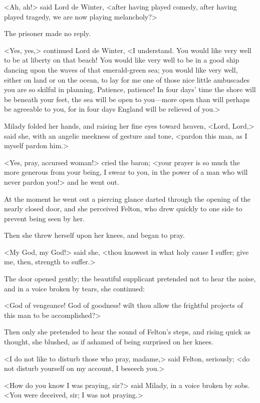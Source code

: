 <Ah, ah!> said Lord de Winter, <after having played comedy, after having played tragedy, we are now playing melancholy?> 

The prisoner made no reply. 

<Yes, yes,> continued Lord de Winter, <I understand. You would like very well to be at liberty on that beach! You would like very well to be in a good ship dancing upon the waves of that emerald-green sea; you would like very well, either on land or on the ocean, to lay for me one of those nice little ambuscades you are so skilful in planning. Patience, patience! In four days' time the shore will be beneath your feet, the sea will be open to you---more open than will perhaps be agreeable to you, for in four days England will be relieved of you.> 

Milady folded her hands, and raising her fine eyes toward heaven, <Lord, Lord,> said she, with an angelic meekness of gesture and tone, <pardon this man, as I myself pardon him.> 

<Yes, pray, accursed woman!> cried the baron; <your prayer is so much the more generous from your being, I swear to you, in the power of a man who will never pardon you!> and he went out. 

At the moment he went out a piercing glance darted through the opening of the nearly closed door, and she perceived Felton, who drew quickly to one side to prevent being seen by her. 

Then she threw herself upon her knees, and began to pray. 

<My God, my God!> said she, <thou knowest in what holy cause I suffer; give me, then, strength to suffer.> 

The door opened gently; the beautiful supplicant pretended not to hear the noise, and in a voice broken by tears, she continued: 

<God of vengeance! God of goodness! wilt thou allow the frightful projects of this man to be accomplished?> 

Then only she pretended to hear the sound of Felton's steps, and rising quick as thought, she blushed, as if ashamed of being surprised on her knees. 

<I do not like to disturb those who pray, madame,> said Felton, seriously; <do not disturb yourself on my account, I beseech you.> 

<How do you know I was praying, sir?> said Milady, in a voice broken by sobs. <You were deceived, sir; I was not praying.> 

